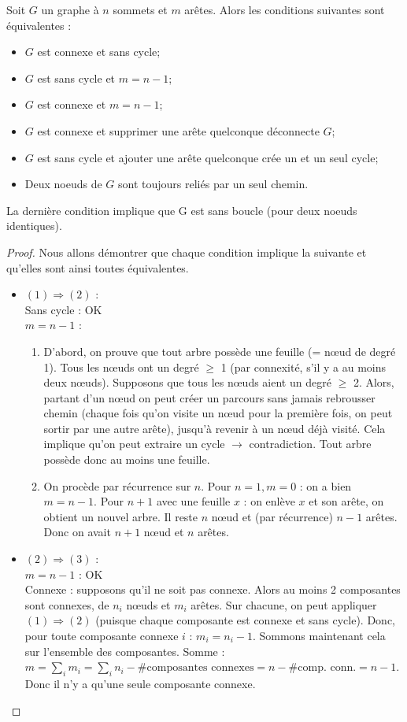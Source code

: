 \begin{mytheo} 
  Soit $G$ un graphe à $n$ sommets et $m$ arêtes. Alors les conditions suivantes sont équivalentes :
  \begin{itemize}
    \item $G$ est connexe et sans cycle;
    \item $G$ est sans cycle et $m = n − 1$;
    \item $G$ est connexe et $m = n − 1$;
    \item $G$ est connexe et supprimer une arête quelconque déconnecte $G$;
    \item $G$ est sans cycle et ajouter une arête quelconque crée un et un seul cycle;
    \item Deux noeuds de $G$ sont toujours reliés par un seul chemin.
  \end{itemize}
  La dernière condition implique que G est sans boucle (pour deux noeuds identiques).
  \begin{proof}
  Nous allons démontrer que chaque condition implique la suivante et qu'elles sont ainsi toutes équivalentes.
  \begin{itemize}
  \item $(1) \Rightarrow (2)$ :\\
  Sans cycle : OK\\
  $m = n-1$ :
  \begin{enumerate}[$\bullet$]
  \item D'abord, on prouve que tout arbre possède une feuille (= nœud de degré 1). Tous les nœuds ont un degré $\geq$ 1 (par connexité, s'il y a au moins deux nœuds). Supposons que tous les nœuds aient un degré $\geq$ 2. Alors, partant d'un nœud on peut créer un parcours sans jamais rebrousser chemin (chaque fois qu'on visite un nœud pour la première fois, on peut sortir par une autre arête), jusqu'à revenir à un nœud déjà visité. Cela implique qu'on peut extraire un cycle $\rightarrow$ contradiction. Tout arbre possède donc au moins une feuille.
  \item On procède par récurrence sur $n$. Pour $n=1, m=0$ : on a bien $m = n − 1$. Pour $n+1$ avec une feuille $x$ : on enlève $x$ et son arête, on obtient un nouvel arbre. Il reste $n$ nœud et (par récurrence) $n-1$ arêtes. Donc on avait $n+1$ nœud et $n$ arêtes.
  \end{enumerate}

  \item $(2) \Rightarrow (3)$ :\\
  $m = n-1$ : OK\\
  Connexe : supposons qu'il ne soit pas connexe. Alors au moins 2 composantes sont connexes, de $n_i$ nœuds et $m_i$ arêtes. Sur chacune, on peut appliquer $(1) \Rightarrow (2)$ (puisque chaque composante est connexe et sans cycle). Donc, pour toute composante connexe $i$ : $m_i = n_i -1$. Sommons maintenant cela sur l'ensemble des composantes. Somme : $m = \sum_i m_i = \sum_i n_i - \# \text{composantes connexes} = n - \# \text{comp. conn.} = n - 1$. Donc il n'y a qu'une seule composante connexe.


\end{itemize}
\end{proof}
\end{mytheo}
